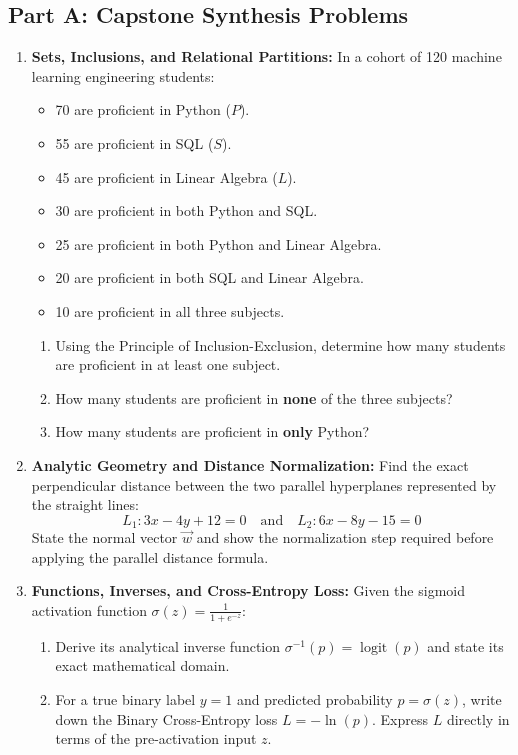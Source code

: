 \subsection*{Part A: Capstone Synthesis Problems}

\begin{enumerate}
    \item \textbf{Sets, Inclusions, and Relational Partitions:}
    In a cohort of 120 machine learning engineering students:
    \begin{itemize}
        \item 70 are proficient in Python ($P$).
        \item 55 are proficient in SQL ($S$).
        \item 45 are proficient in Linear Algebra ($L$).
        \item 30 are proficient in both Python and SQL.
        \item 25 are proficient in both Python and Linear Algebra.
        \item 20 are proficient in both SQL and Linear Algebra.
        \item 10 are proficient in all three subjects.
    \end{itemize}
    \begin{enumerate}
        \item Using the Principle of Inclusion-Exclusion, determine how many students are proficient in at least one subject.
        \item How many students are proficient in \textbf{none} of the three subjects?
        \item How many students are proficient in \textbf{only} Python?
    \end{enumerate}

    \item \textbf{Analytic Geometry and Distance Normalization:}
    Find the exact perpendicular distance between the two parallel hyperplanes represented by the straight lines:
    \begin{equation}
    L_1: 3x - 4y + 12 = 0 \quad \text{and} \quad L_2: 6x - 8y - 15 = 0
    \end{equation}
    State the normal vector $\vec{w}$ and show the normalization step required before applying the parallel distance formula.

    \item \textbf{Functions, Inverses, and Cross-Entropy Loss:}
    Given the sigmoid activation function $\sigma(z) = \frac{1}{1 + e^{-z}}$:
    \begin{enumerate}
        \item Derive its analytical inverse function $\sigma^{-1}(p) = \operatorname{logit}(p)$ and state its exact mathematical domain.
        \item For a true binary label $y = 1$ and predicted probability $p = \sigma(z)$, write down the Binary Cross-Entropy loss $L = -\ln(p)$. Express $L$ directly in terms of the pre-activation input $z$.
    \end{enumerate}


\end{enumerate}
